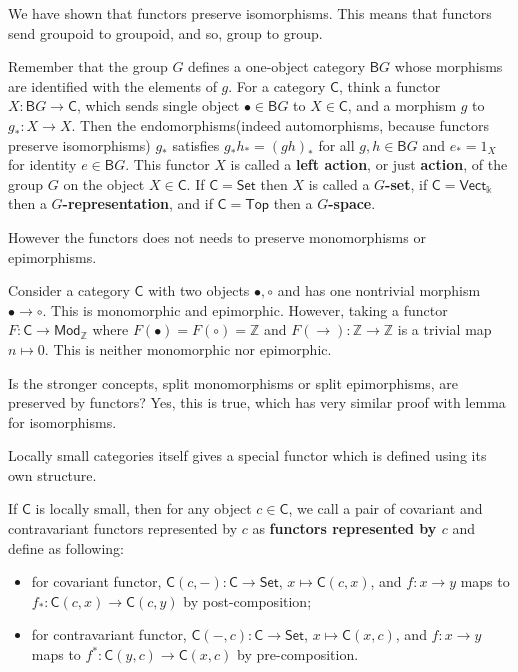 We have shown that functors preserve isomorphisms. This means that functors send groupoid to groupoid, and so, group to group.
\begin{exmp} Remember that the group $G$ defines a one-object category $\mathsf{B}G$ whose morphisms are identified with the elements of $g$. For a category $\mathsf{C}$, think a functor $X:\mathsf{B}G\rightarrow \mathsf{C}$, which sends single object $\bullet\in\mathsf{B}G$ to $X\in\mathsf{C}$, and a morphism $g$ to $g_*:X\rightarrow X$. Then the endomorphisms(indeed automorphisms, because functors preserve isomorphisms) $g_*$ satisfies $g_* h_*=(gh)_*$ for all $g,h\in\mathsf{B}G$ and $e_*=1_X$ for identity $e\in\mathsf{B}G$. This functor $X$ is called a \textbf{left action}, or just \textbf{action}, of the group $G$ on the object $X\in\mathsf{C}$. If $\mathsf{C}=\mathsf{Set}$ then $X$ is called a \textbf{$G$-set}, if $\mathsf{C}=\mathsf{Vect}_{\mathbb{k}}$ then a \textbf{$G$-representation}, and if $\mathsf{C}=\mathsf{Top}$ then a \textbf{$G$-space}.
\end{exmp}

However the functors does not needs to preserve monomorphisms or epimorphisms.
\begin{exmp} Consider a category $\mathsf{C}$ with two objects $\bullet,\circ$ and has one nontrivial morphism $\bullet\rightarrow \circ$. This is monomorphic and epimorphic. However, taking a functor $F:\mathsf{C}\rightarrow \mathsf{Mod}_{\mathbb{Z}}$ where $F(\bullet)=F(\circ)=\mathbb{Z}$ and $F(\rightarrow):\mathbb{Z}\rightarrow \mathbb{Z}$ is a trivial map $n\mapsto 0$. This is neither monomorphic nor epimorphic.
\end{exmp}

Is the stronger concepts, split monomorphisms or split epimorphisms, are preserved by functors? Yes, this is true, which has very similar proof with lemma for isomorphisms.

Locally small categories itself gives a special functor which is defined using its own structure.
\begin{defn} If $\mathsf{C}$ is locally small, then for any object $c\in \mathsf{C}$, we call a pair of covariant and contravariant functors represented by $c$ as \textbf{functors represented by $c$} and define as following:
\begin{itemize}
\item for covariant functor, $\mathsf{C}(c,-):\mathsf{C}\rightarrow \mathsf{Set}$, $x\mapsto \mathsf{C}(c,x)$, and $f:x\rightarrow y$ maps to $f_*:\mathsf{C}(c,x)\rightarrow \mathsf{C}(c,y)$ by post-composition;
\item for contravariant functor, $\mathsf{C}(-,c):\mathsf{C}\rightarrow \mathsf{Set}$, $x\mapsto \mathsf{C}(x,c)$, and $f:x\rightarrow y$ maps to $f^*:\mathsf{C}(y,c)\rightarrow \mathsf{C}(x,c)$ by pre-composition.
\end{itemize}
\end{defn}

